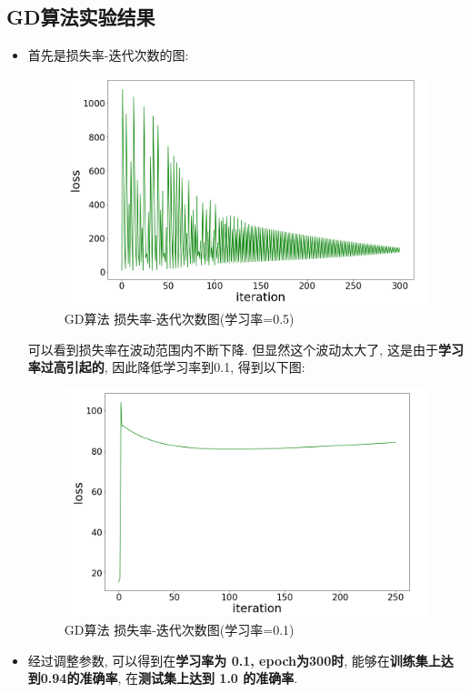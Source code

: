 \documentclass[UTF8]{article}
\begin{document}
\subsection{GD算法实验结果}
\begin{itemize}
	\item 首先是损失率-迭代次数的图:
	\begin{figure}[H]
		\centering
		\includegraphics[width=\linewidth/2]{gd_loss.png}
		\caption{GD算法 损失率-迭代次数图(学习率=0.5)}
	\end{figure}
	可以看到损失率在波动范围内不断下降. 但显然这个波动太大了, 这是由于\textbf{学习率过高引起的}, 因此降低学习率到0.1, 得到以下图:
	\begin{figure}[H]
		\centering
		\includegraphics[width=\linewidth/2]{gd_loss_01.png}
		\caption{GD算法 损失率-迭代次数图(学习率=0.1)}
	\end{figure}
	\item 经过调整参数, 可以得到在\textbf{学习率为 0.1, epoch为300时}, 能够在\textbf{训练集上达到0.94的准确率}, 在\textbf{测试集上达到 1.0 的准确率}.

\end{itemize}
\end{document}
